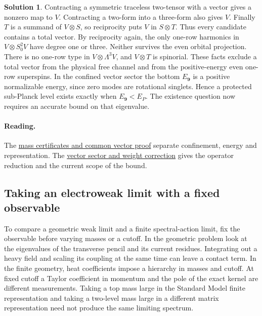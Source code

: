 \documentclass[10pt]{article}
\theoremstyle{definition}
\newtheorem{solution}{Solution}
\begin{document}
\begin{solution}
Contracting a symmetric traceless two-tensor with a vector gives a nonzero map to \(V\). Contracting a two-form into a three-form also gives \(V\). Finally \(T\) is a summand of \(V\otimes S\), so reciprocity puts \(V\) in \(S\otimes T\). Thus every candidate contains a total vector. By reciprocity again, the only one-row harmonics in \(V\otimes S_0^2V\) have degree one or three. Neither survives the even orbital projection. There is no one-row type in \(V\otimes\Lambda^3V\), and \(V\otimes T\) is spinorial. These facts exclude a total vector from the physical free channel and from the positive-energy even one-row superspins. In the confined vector sector the bottom \(E_{\mathbf9}\) is a positive normalizable energy, since zero modes are rotational singlets. Hence a protected sub-Planck level exists exactly when \(E_{\mathbf9}<E_P\). The existence question now requires an accurate bound on that eigenvalue.
\end{solution}

\paragraph{Reading.} The \href{https://github.com/arivero/conneskk/blob/master/results/56_two_d0_mass_certificate.md}{mass certificates and common vector proof} separate confinement, energy and representation. The \href{https://github.com/arivero/conneskk/blob/master/results/58_two_d0_vector_spectrum.md}{vector sector and weight correction} gives the operator reduction and the current scope of the bound.

\subsection{Taking an electroweak limit with a fixed observable}

To compare a geometric weak limit and a finite spectral-action limit, fix the observable before varying masses or a cutoff. In the geometric problem look at the eigenvalues of the transverse pencil and its current residues. Integrating out a heavy field and scaling its coupling at the same time can leave a contact term. In the finite geometry, heat coefficients impose a hierarchy in masses and cutoff. At fixed cutoff a Taylor coefficient in momentum and the pole of the exact kernel are different measurements. Taking a top mass large in the Standard Model finite representation and taking a two-level mass large in a different matrix representation need not produce the same limiting spectrum.
\end{document}
